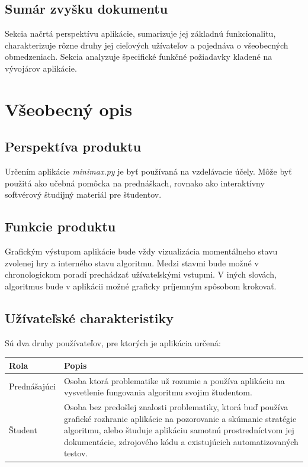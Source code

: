 \documentclass{article}
\begin{document}
\subsection{Sumár zvyšku dokumentu}\label{subsec:summary}
Sekcia  načrtá perspektívu aplikácie, sumarizuje jej základnú funkcionalitu, charakterizuje rôzne druhy jej cieľových užívateľov a pojednáva o všeobecných obmedzeniach.
Sekcia  analyzuje špecifické funkčné požiadavky kladené na vývojárov aplikácie.
\newpage

\section{Všeobecný opis}\label{sec:general}
\subsection{Perspektíva produktu}
Určením aplikácie \emph{minimax.py} je byť používaná na vzdelávacie účely. Môže byť použitá ako učebná pomôcka na prednáškach, rovnako ako interaktívny softvérový študijný materiál pre študentov.

\subsection{Funkcie produktu}\label{subsec:functionality}
Grafickým výstupom aplikácie bude vždy vizualizácia momentálneho stavu zvolenej hry a interného stavu algoritmu. Medzi stavmi bude možné v chronologickom poradí prechádzať užívateľskými vstupmi.
V iných slovách, algoritmus bude v aplikácii možné graficky príjemným spôsobom krokovať.

\subsection{Užívateľské charakteristiky}\label{subsec:targetuser}
Sú dva druhy používateľov, pre ktorých je aplikácia určená: \\
\begin{tabular}{|l|p{32em}|}
	\hline
	\textbf{Rola} &
	\textbf{Popis} \\
	\hline
	Prednášajúci &
	Osoba ktorá problematike už rozumie a používa aplikáciu na vysvetlenie fungovania algoritmu svojim študentom. \\ 
	\hline
	Študent &
	Osoba bez predošlej znalosti problematiky, ktorá buď používa grafické rozhranie aplikácie na pozorovanie a skúmanie stratégie algoritmu, alebo študuje aplikáciu samotnú prostredníctvom jej dokumentácie, zdrojového kódu a existujúcich automatizovaných testov. \\
	\hline
\end{tabular}
\end{document}

